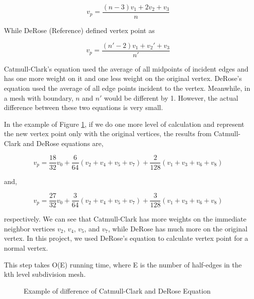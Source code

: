 \documentclass[12pt]{article}
\begin{document}
$$v_p=\frac{(n - 3)v_1 + 2v_2 + v_3}{n}$$

While DeRose (Reference) defined vertex point as

$$v_p=\frac{(n' - 2)v_1 + v_2' + v_3}{n'}$$

Catmull-Clark's equation used the average of all midpoints of incident edges and has one more weight on it and one less weight on the original vertex. DeRose's equation used the average of all edge points incident to the vertex. Meanwhile, in a mesh with boundary, $n$ and $n'$ would be different by 1. However, the actual difference between these two equations is very small. 

In the example of Figure \ref{figure:differenceCandD}, if we do one more level of calculation and represent the new vertex point only with the original vertices, the results from Catmull-Clark and DeRose equations are,

$$v_p=\frac{18}{32}v_0 + \frac{6}{64}(v_2 + v_4 + v_5 + v_7) + \frac{2}{128}(v_1 + v_3 + v_6 + v_8)$$

and,

$$v_p=\frac{27}{32}v_0 + \frac{3}{64}(v_2 + v_4 + v_5 + v_7) + \frac{3}{128}(v_1 + v_3 + v_6 + v_8)$$

respectively. We can see that Catmull-Clark has more weights on the immediate neighbor vertices $v_2$, $v_4$, $v_5$, and $v_7$, while DeRose has much more on the original vertex. In this project, we used DeRose's equation to calculate vertex point for a normal vertex.

This step takes O(E) running time, where E is the number of half-edges in the kth level subdivision mesh.

\begin{figure}[ht]
  \centering
  \caption{Example of difference of Catmull-Clark and DeRose Equation}
  \label{figure:differenceCandD}
\end{figure}
\end{document}
